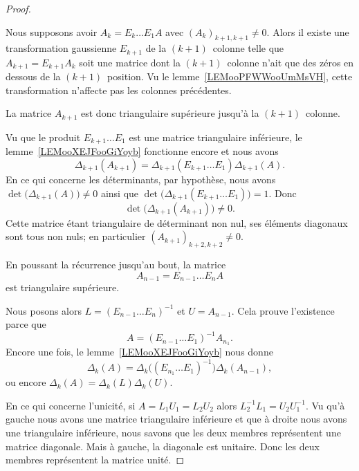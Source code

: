 \begin{proof}
\begin{subproof}

		Nous supposons avoir \( A_k=E_k\ldots E_1A\) avec \( (A_k)_{k+1,k+1}\neq 0\). Alors il existe une transformation gaussienne \( E_{k+1}\) de la \( (k+1)\)\ieme\ colonne telle que \( A_{k+1}=E_{k+1}A_k\) soit une matrice dont la \( (k+1)\)\ieme\ colonne n'ait que des zéros en dessous de la \( (k+1)\)\ieme\ position. Vu le lemme~\ref{LEMooPFWWooUmMsVH}, cette transformation n'affecte pas les colonnes précédentes.

		La matrice \( A_{k+1}\) est donc triangulaire supérieure jusqu'à la \( (k+1)\)\ieme\ colonne.

		Vu que le produit \( E_{k+1}\ldots E_1\) est une matrice triangulaire inférieure, le lemme~\ref{LEMooXEJFooGiYoyb} fonctionne encore et nous avons
		\begin{equation}
			\Delta_{k+1}(A_{k+1})=\Delta_{k+1}(E_{k+1}\ldots E_1)\Delta_{k+1}(A).
		\end{equation}
		En ce qui concerne les déterminants, par hypothèse, nous avons \( \det\big( \Delta_{k+1}(A) \big)\neq 0\) ainsi que \( \det\big( \Delta_{k+1}(E_{k+1}\ldots E_1) \big)=1\). Donc
		\begin{equation}
			\det\big( \Delta_{k+1}(A_{k+1}) \big)\neq 0.
		\end{equation}
		Cette matrice étant triangulaire de déterminant non nul, ses éléments diagonaux sont tous non nuls; en particulier \( (A_{k+1})_{k+2,k+2}\neq 0\).
	\end{subproof}

	En poussant la récurrence jusqu'au bout, la matrice
	\begin{equation}
		A_{n-1}=E_{n-1}\ldots E_nA
	\end{equation}
	est triangulaire supérieure.

	Nous posons alors \(   L=(E_{n-1}\ldots E_n)^{-1}  \) et \( U=A_{n-1}\). Cela prouve l'existence parce que
	\begin{equation}
		A=(E_{n-1}\ldots E_1)^{-1}A_{n_1}.
	\end{equation}
	Encore une fois, le lemme~\ref{LEMooXEJFooGiYoyb} nous donne
	\begin{equation}
		\Delta_k(A)=\Delta_k\Big( (E_{n_1}\ldots E_1)^{-1} \Big)\Delta_k(A_{n-1}),
	\end{equation}
	ou encore \( \Delta_k(A)=\Delta_k(L)\Delta_k(U)\).

	En ce qui concerne l'unicité, si \( A=L_1U_1=L_2U_2\) alors \( L_2^{-1}L_1=U_2U_1^{-1} \). Vu qu'à gauche nous avons une matrice triangulaire inférieure et que à droite nous avons une triangulaire inférieure, nous savons que les deux membres représentent une matrice diagonale. Mais à gauche, la diagonale est unitaire. Donc les deux membres représentent la matrice unité.
\end{proof}

